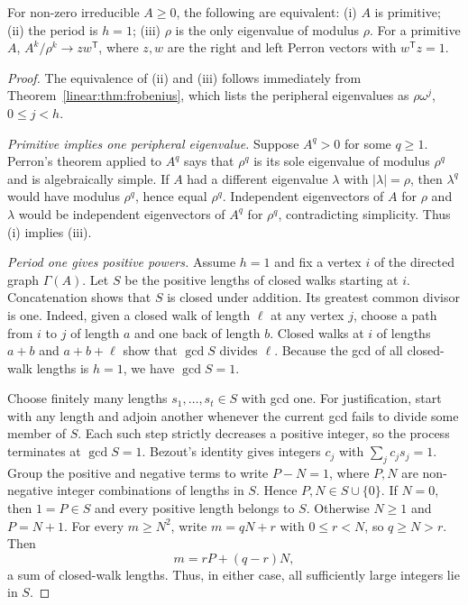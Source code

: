 \begin{theorem}\label{linear:thm:primitive}
For non-zero irreducible $A\ge0$, the following are equivalent: (i) $A$ is primitive; (ii) the period is $h=1$; (iii) $\rho$ is the
only eigenvalue of modulus $\rho$. For a primitive $A$, $A^k/\rho^k\to zw^{\mathsf T}$, where $z,w$ are the right and left Perron
vectors with $w^{\mathsf T}z=1$.
\end{theorem}
\begin{proof}
The equivalence of (ii) and (iii)
follows immediately from
Theorem~\ref{linear:thm:frobenius},
which lists the peripheral eigenvalues
as $\rho\omega^j$, $0\le j<h$.

\emph{Primitive implies one peripheral
eigenvalue.}
Suppose $A^q>0$ for some $q\ge1$.
Perron's theorem applied to $A^q$
says that $\rho^q$ is its sole
eigenvalue of modulus $\rho^q$
and is algebraically simple.
If $A$ had a different eigenvalue
$\lambda$ with $|\lambda|=\rho$,
then $\lambda^q$ would have modulus
$\rho^q$, hence equal $\rho^q$.
Independent eigenvectors of $A$
for $\rho$ and $\lambda$ would
be independent eigenvectors of
$A^q$ for $\rho^q$, contradicting
simplicity. Thus (i) implies (iii).

\emph{Period one gives positive
powers.}
Assume $h=1$ and fix a vertex $i$
of the directed graph $\Gamma(A)$.
Let $S$ be the positive lengths
of closed walks starting at $i$.
Concatenation shows that $S$ is
closed under addition.
Its greatest common divisor is
one. Indeed, given a closed walk
of length $\ell$ at any vertex $j$,
choose a path from $i$ to $j$
of length $a$ and one back of
length $b$. Closed walks at $i$
of lengths $a+b$ and $a+b+\ell$
show that $\gcd S$ divides $\ell$.
Because the gcd of all closed-walk
lengths is $h=1$, we have
$\gcd S=1$.

Choose finitely many lengths $s_1,\ldots,s_t\in S$ with gcd one.
For justification, start with any length and adjoin another whenever the
current gcd fails to divide some member of $S$. Each such step strictly
decreases a positive integer, so the process terminates at $\gcd S=1$.
Bezout's identity gives integers
$c_j$ with $\sum_jc_js_j=1$.
Group the positive and negative
terms to write $P-N=1$, where
$P,N$ are non-negative integer
combinations of lengths in $S$.
Hence $P,N\in S\cup\{0\}$.
If $N=0$, then $1=P\in S$ and
every positive length belongs to $S$.
Otherwise $N\ge1$ and
$P=N+1$. For every $m\ge N^2$,
write $m=qN+r$ with $0\le r<N$,
so $q\ge N>r$. Then
\[
m=rP+(q-r)N,
\]
a sum of closed-walk lengths.
Thus, in either case, all
sufficiently large integers lie
in $S$.


\end{proof}
